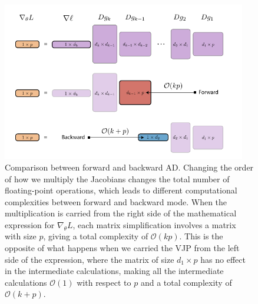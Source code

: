 \begin{figure}[t]
    \centering
    \includegraphics[width=0.95\textwidth]{tex/figures/VJP-AD.pdf}
    \caption{Comparison between forward and backward AD. Changing the order of how we multiply the Jacobians changes the total number of floating-point operations, which leads to different computational complexities between forward and backward mode. When the multiplication is carried from the right side of the mathematical expression for $\nabla_\theta L$, each matrix simplification involves a matrix with size $p$, giving a total complexity of $\mathcal O (kp)$. This is the opposite of what happens when we carried the VJP from the left side of the expression, where the matrix of size $d_1 \times p$ has no effect in the intermediate calculations, making all the intermediate calculations $\mathcal O (1)$ with respect to $p$ and a total complexity of $\mathcal O (k + p)$. }
    \label{fig:vjp-jvp}
\end{figure}
